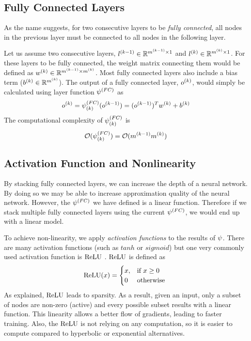 \subsection{Fully Connected Layers}
As the name suggests, for two consecutive layers to be \textit{fully connected}, all nodes in the previous layer must be connected to all nodes in the following layer. 

Let us assume two consecutive layers, $l^{(k-1)} \in \mathbb{R}^{m^{(k-1)} \times 1}$ and $l^{(k)} \in \mathbb{R}^{m^{(k)} \times 1}$. For these layers to be fully connected, the weight matrix connecting them would be defined as $w^{(k)} \in \mathbb{R}^{m^{(k-1)} \times m^{(k)}}$. Most fully connected layers also include a bias term ($b^{(k)} \in  \mathbb{R}^{m^{(k)}}$). The output of a fully connected layer, $o^{(k)}$, would simply be calculated using layer function $\psi^{(FC)}$ as
$$ o^{(k)} = \psi^{(FC)}_{(k)}(o^{(k-1)}) = (o^{(k-1)})^T w^{(k)} + b^{(k)}$$
The computational complexity of $\psi^{(FC)}_{(k)}$ is
$$\mathcal{O}(\psi^{(FC)}_{(k)}) = \mathcal{O}(m^{(k-1)}m^{(k)})$$

\subsection{Activation Function and Nonlinearity}
By stacking fully connected layers, we can increase the depth of a neural network. By doing so we may be able to increase approximation quality of the neural network. However, the $\psi^{(FC)}$ we have defined is a linear function. Therefore if we stack multiple fully connected layers using the current $\psi^{(FC)}$, we would end up with a linear model. 

To achieve non-linearity, we apply \textit{activation functions} to the results of $\psi$. There are many activation functions (such as $tanh$ or $sigmoid$) but one very commonly used activation function is $\textrm{ReLU}$ \cite{nair2010rectified}.  $\textrm{ReLU}$ is defined as
\begin{equation}
\label{eq:relu_definition}
    \textrm{ReLU}(x) = 
\begin{cases}
    x, & \text{if }x \geq 0\\
    0 &  \text{otherwise }\\
\end{cases}
\end{equation}
As \cite{glorot2011deep} explained, $\textrm{ReLU}$ leads to sparsity. As a result, given an input, only a subset of nodes are non-zero (active) and every possible subset results with a linear function. This linearity allows a better flow of gradients, leading to faster training. Also, the $\textrm{ReLU}$ is not relying on any computation, so it is easier to compute compared to hyperbolic or exponential alternatives.

